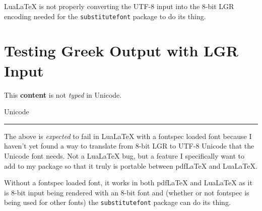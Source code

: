 \documentclass[letterpaper, fontsize=14pt]{scrartcl}
\begin{document}
Lua\LaTeX{} is not properly converting the UTF-8 input into the 8-bit LGR encoding needed for the \texttt{substitutefont} package to do its thing.

\section{Testing Greek Output with LGR Input}

This \textbf{content} is not \textit{typed} in Unicode.

 Unicode

\rule{4cm}{0.4pt}

The above is \emph{expected} to fail in Lua\LaTeX{} with a fontspec loaded font because I haven't yet found a way to translate from 8-bit LGR to UTF-8 Unicode that the Unicode font needs. Not a Lua\LaTeX{} bug, but a feature I specifically want to add to my package so that it truly is portable between pdfLaTeX{} and Lua\LaTeX{}.

Without a fontspec loaded font, it works in both pdf\LaTeX{} and Lua\LaTeX{} as it is 8-bit input being rendered with an 8-bit font and (whether or not fontspec is being used for other fonts) the \texttt{substitutefont} package can do its thing.
\end{document}
